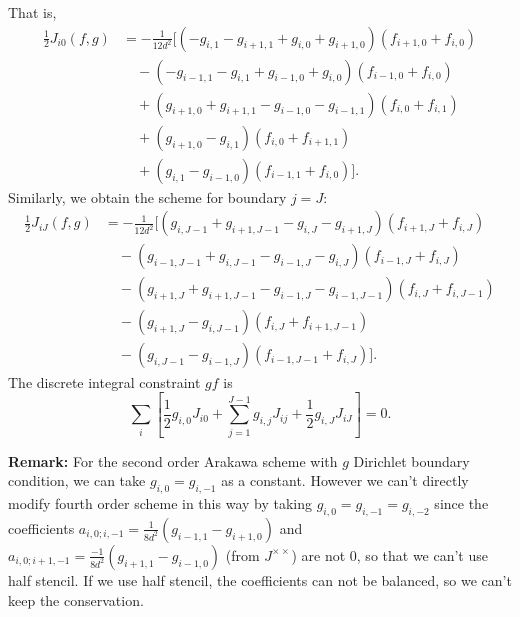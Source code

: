 That is,
\begin{equation}
	\begin{aligned}
		\frac{1}{2}J_{i0} (f,g) & = -\frac{1}{12d^2}[(-g_{i,1}-g_{i+1,1}+g_{i,0}+g_{i+1,0})(f_{i+1,0}+f_{i,0})\\
		& \quad - (-g_{i-1,1}-g_{i,1}+g_{i-1,0}+g_{i,0})(f_{i-1,0}+f_{i,0})\\
		& \quad + (g_{i+1,0}+g_{i+1,1}-g_{i-1,0}-g_{i-1,1})(f_{i,0}+f_{i,1})\\
		& \quad + (g_{i+1,0}-g_{i,1})(f_{i,0}+f_{i+1,1})\\
		& \quad + (g_{i,1}-g_{i-1,0})(f_{i-1,1}+f_{i,0})].
	\end{aligned}
\end{equation}
Similarly, we obtain the scheme for boundary $j=J$:
\begin{equation}
	\begin{aligned}
		\frac{1}{2}J_{iJ} (f,g) & = -\frac{1}{12d^2}[(g_{i,J-1}+g_{i+1,J-1}-g_{i,J}-g_{i+1,J})(f_{i+1,J}+f_{i,J})\\
		& \quad - (g_{i-1,J-1}+g_{i,J-1}-g_{i-1,J}-g_{i,J})(f_{i-1,J}+f_{i,J})\\
		& \quad - (g_{i+1,J}+g_{i+1,J-1}-g_{i-1,J}-g_{i-1,J-1})(f_{i,J}+f_{i,J-1})\\
		& \quad - (g_{i+1,J}-g_{i,J-1})(f_{i,J}+f_{i+1,J-1})\\
		& \quad - (g_{i,J-1}-g_{i-1,J})(f_{i-1,J-1}+f_{i,J})].
	\end{aligned}
\end{equation}
The discrete integral constraint $gf$ is $$\sum_{i}\left[ \frac{1}{2}g_{i,0}J_{i0}+\sum_{j=1}^{J-1} g_{i,j}J_{ij}+\frac{1}{2}g_{i,J}J_{iJ} \right]=0.$$

\textbf{Remark:} For the second order Arakawa scheme with $g$ Dirichlet boundary condition, we can take $g_{i,0}=g_{i,-1}$ as a constant. However we can't directly modify fourth order scheme in this way by taking $g_{i,0}=g_{i,-1}=g_{i,-2}$ since the coefficients  $a_{i,0;i,-1}=\frac{1}{8d^2}(g_{i-1,1}-g_{i+1,0})$ and $a_{i,0;i+1,-1}=\frac{-1}{8d^2}(g_{i+1,1}-g_{i-1,0})$ (from $J^{\times \times}$) are not 0, so that we can't use half stencil. If we use half stencil, the coefficients can not be balanced, so we can't keep the conservation.

